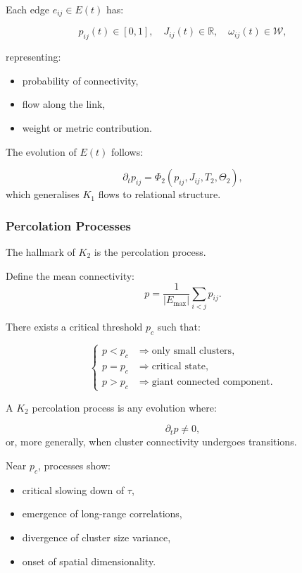Each edge $e_{ij} \in E(t)$ has:

\[
p_{ij}(t) \in [0,1], \quad
J_{ij}(t) \in \mathbb{R}, \quad
\omega_{ij}(t) \in \mathcal{W},
\]

representing:
\begin{itemize}
    \item probability of connectivity,
    \item flow along the link,
    \item weight or metric contribution.
\end{itemize}

The evolution of $E(t)$ follows:

\[
\partial_t p_{ij} = \Phi_2(p_{ij}, J_{ij}, T_2, \Theta_2),
\]
which generalises $K_1$ flows to relational structure.

\subsubsection{Percolation Processes}

The hallmark of $K_2$ is the percolation process.

Define the mean connectivity:
\[
p = \frac{1}{|E_{\max}|} \sum_{i<j} p_{ij}.
\]

There exists a critical threshold $p_c$ such that:

\[
\begin{cases}
p < p_c & \Rightarrow \text{only small clusters}, \\
p = p_c & \Rightarrow \text{critical state}, \\
p > p_c & \Rightarrow \text{giant connected component}.
\end{cases}
\]

A $K_2$ percolation process is any evolution where:

\[
\partial_t p \neq 0,
\]
or, more generally, when cluster connectivity undergoes transitions.

Near $p_c$, processes show:

\begin{itemize}
    \item critical slowing down of $\tau$,
    \item emergence of long-range correlations,
    \item divergence of cluster size variance,
    \item onset of spatial dimensionality.
\end{itemize}

